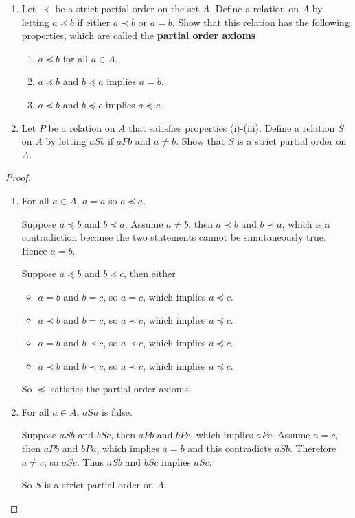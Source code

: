 \begin{exercise}\label{chapter1:section11:exercise2}
    \begin{enumerate}[label={(\alph*)}]
        \item Let $\prec$ be a strict partial order on the set $A$. Define a relation on $A$ by letting $a\preceq b$ if either $a\prec b$ or $a = b$. Show that this relation has the following properties, which are called the \textbf{partial order axioms}
              \begin{enumerate}[label={(\roman*)}]
                  \item $a\preceq b$ for all $a\in A$.
                  \item $a\preceq b$ and $b\preceq a$ implies $a = b$.
                  \item $a\preceq b$ and $b\preceq c$ implies $a\preceq c$.
              \end{enumerate}
        \item Let $P$ be a relation on $A$ that satisfies properties {(i)}-{(iii)}. Define a relation $S$ on $A$ by letting $aSb$ if $aPb$ and $a\ne b$. Show that $S$ is a strict partial order on $A$.
    \end{enumerate}
\end{exercise}

\begin{proof}
    \begin{enumerate}[label={(\alph*)}]
        \item For all $a\in A$, $a = a$ so $a\preceq a$.

              Suppose $a\preceq b$ and $b\preceq a$. Assume $a\ne b$, then $a\prec b$ and $b\prec a$, which is a contradiction because the two statements cannot be simutaneously true. Hence $a = b$.

              Suppose $a\preceq b$ and $b\preceq c$, then either
              \begin{itemize}
                  \item $a = b$ and $b = c$, so $a = c$, which implies $a\preceq c$.
                  \item $a\prec b$ and $b = c$, so $a\prec c$, which implies $a\preceq c$.
                  \item $a = b$ and $b\prec c$, so $a\prec c$, which implies $a\preceq c$.
                  \item $a\prec b$ and $b\prec c$, so $a\prec c$, which implies $a\preceq c$.
              \end{itemize}

              So $\preceq$ satisfies the partial order axioms.
        \item For all $a\in A$, $aSa$ is false.

              Suppose $aSb$ and $bSc$, then $aPb$ and $bPc$, which implies $aPc$. Assume $a = c$, then $aPb$ and $bPa$, which implies $a = b$ and this contradicts $aSb$. Therefore $a\ne c$, so $aSc$. Thus $aSb$ and $bSc$ implies $aSc$.

              So $S$ is a strict partial order on $A$.
    \end{enumerate}
\end{proof}


